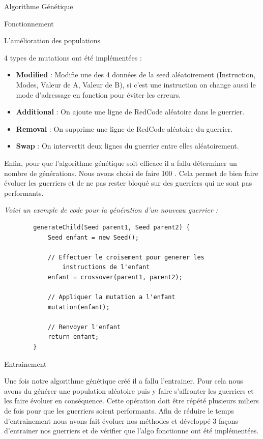 \documentclass[a4paper, 10pt]{article}
\begin{document}
\begin{section}{Algorithme Génétique}
\begin{subsection}{Fonctionnement}
\begin{subsubsection}{L'amélioration des populations}
                    \medskip
                \par
                    4 types de mutations ont été implémentées : 
                    \begin{itemize}
                        \item \textbf{Modified} : Modifie une des 4 données de la seed aléatoirement (Instruction, Modes, Valeur de A, Valeur de B), si c'est une instruction on change aussi le mode d'adressage en fonction pour éviter les erreurs.
                        \item \textbf{Additional} : On ajoute une ligne de RedCode aléatoire dans le guerrier.
                        \item \textbf{Removal} : On supprime une ligne de RedCode aléatoire du guerrier.
                        \item \textbf{Swap} : On intervertit deux lignes du guerrier entre elles aléatoirement.
                    \end{itemize}
                    \bigskip
                \par
                    Enfin, pour que l'algorithme génétique soit efficace il a fallu déterminer un nombre de générations. Nous avons choisi de faire 100 . Cela permet de bien faire évoluer les guerriers et de ne pas rester bloqué sur des guerriers qui ne sont pas performants.
                    \bigskip

                \end{subsubsection}
        \end{subsection}

        \par
        \textit{Voici un exemple de code pour la génération d'un nouveau guerrier :}
        \begin{lstlisting}
        generateChild(Seed parent1, Seed parent2) {
            Seed enfant = new Seed();
        
            // Effectuer le croisement pour generer les
                instructions de l'enfant
            enfant = crossover(parent1, parent2);
        
            // Appliquer la mutation a l'enfant
            mutation(enfant);
        
            // Renvoyer l'enfant
            return enfant;
        }
        \end{lstlisting}
        \bigskip


        \begin{subsection}{Entrainement}\label{sec:entrainement}
            \par
                Une fois notre algorithme génétique créé il a fallu l'entrainer. Pour cela nous avons du générer une population aléatoire puis y faire s'affronter les guerriers et les faire évoluer en conséquence. Cette opération doit être répété plusieurs miliers de fois pour que les guerriers soient performants. Afin de réduire le temps d'entrainement nous avons fait évoluer nos méthodes et développé 3 façons d'entrainer nos guerriers et de vérifier que l'algo fonctionne ont été implémentées.


\end{subsection}
\end{section}
\end{document}
